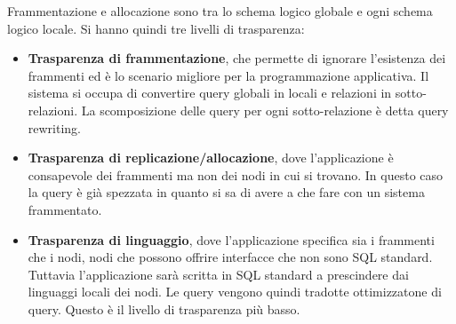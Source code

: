 Frammentazione e allocazione sono tra lo schema logico globale e ogni schema
logico locale. Si hanno quindi tre livelli di trasparenza:
\begin{itemize}
      \item \textbf{Trasparenza di frammentazione}, che permette di ignorare
            l'esistenza dei frammenti ed è lo scenario migliore per la
            programmazione applicativa. Il sistema si occupa di convertire query
            globali in locali e relazioni in sotto-relazioni. La scomposizione
            delle query per ogni sotto-relazione è detta query rewriting.
      \item \textbf{Trasparenza di replicazione/allocazione}, dove l'applicazione
            è consapevole dei frammenti ma non dei nodi in cui si trovano. In questo
            caso la query è già spezzata in quanto si sa di avere a che fare con un
            sistema frammentato.
      \item \textbf{Trasparenza di linguaggio}, dove l'applicazione specifica
            sia i frammenti che i nodi, nodi che possono offrire interfacce che
            non sono SQL standard. Tuttavia l'applicazione sarà scritta in SQL
            standard a prescindere dai linguaggi locali dei nodi. Le query
            vengono quindi tradotte ottimizzatone di query. Questo è il livello
            di trasparenza più basso.
\end{itemize}
